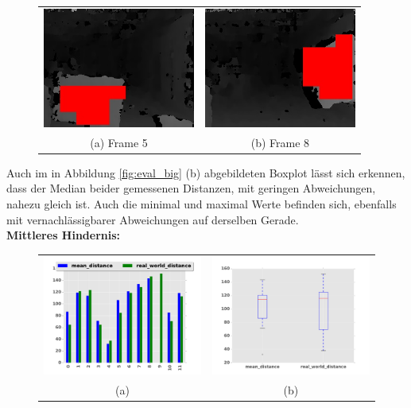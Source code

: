 \begin{figure}[h]
	\centering
	\begin{tabular}{cc}
	\includegraphics[width=5cm]{img/evaluation/_test_5_disparity}&
	\includegraphics[width=5cm]{img/evaluation/_test_8_disparity}\\
	(a) Frame 5 &  (b) Frame 8
	\end{tabular}
	\caption{}
    \label{fig:eval_big_fails}
\end{figure}

\noindent
Auch im in Abbildung \ref{fig:eval_big} (b) abgebildeten Boxplot lässt sich erkennen, dass der Median beider gemessenen Distanzen, mit geringen Abweichungen, nahezu gleich ist. Auch die minimal und maximal Werte befinden sich, ebenfalls mit vernachlässigbarer Abweichungen auf derselben Gerade.\\

\noindent
\textbf{Mittleres Hindernis:}\\
\begin{figure}[h]
	\centering
	\begin{tabular}{cc}
	\includegraphics[width=7cm]{img/evaluation/diagrams/sub_medium_bar}&
	\includegraphics[width=7cm]{img/evaluation/diagrams/sub_medium_box}\\
	(a) &  (b)
	\end{tabular}
    \caption{}
    \label{fig:eval_medium}
\end{figure}

